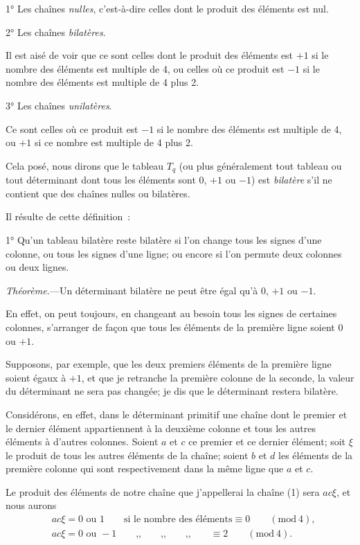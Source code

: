 \documentclass{article}
\begin{document}
1° Les chaînes \emph{nulles}, c'est-à-dire celles dont le produit des éléments est nul.

2° Les chaînes \emph{bilatères}.

Il est aisé de voir que ce sont celles dont le produit des éléments est $+1$ si le nombre des éléments est multiple de 4, ou celles où ce produit est $-1$ si le nombre des éléments est multiple de 4 plus 2.

3° Les chaînes \emph{unilatères}.

Ce sont celles où ce produit est $-1$ si le nombre des éléments est multiple de 4, ou $+1$ si ce nombre est multiple de 4 plus 2.

Cela posé, nous dirons que le tableau $T_{q}$ (ou plus généralement tout tableau ou tout déterminant dont tous les éléments sont 0, $+1$ ou $-1$) est \emph{bilatère} s'il ne contient que des chaînes nulles ou bilatères.

Il résulte de cette définition~:

1° Qu'un tableau bilatère reste bilatère si l'on change tous les signes d'une colonne, ou tous les signes d'une ligne; ou encore si l'on permute deux colonnes ou deux lignes.

\emph{Théorème.}---Un déterminant bilatère ne peut être égal qu'à 0, $+1$ ou $-1$.

En effet, on peut toujours, en changeant au besoin tous les signes de certaines colonnes, s'arranger de façon que tous les éléments de la première ligne soient 0 ou $+1$.

Supposons, par exemple, que les deux premiers éléments de la première ligne soient égaux à $+1$, et que je retranche la première colonne de la seconde, la valeur du déterminant ne sera pas changée; je dis que le déterminant restera bilatère.

Considérons, en effet, dans le déterminant primitif une chaîne dont le premier et le dernier élément appartiennent à la deuxième colonne
et tous les autres éléments à d'autres colonnes. Soient $a$ et $c$ ce premier et ce dernier élément; soit $\xi$ le produit de tous les autres éléments de la chaîne; soient $b$ et $d$ les éléments de la première colonne qui sont respectivement dans la même ligne que $a$ et $c$.

Le produit des éléments de notre chaîne que j'appellerai la chaîne (1) sera $ac\xi$, et nous aurons
\[ \begin{aligned} &ac\xi = 0 \text{ ou } 1 \qquad \text{si le nombre des éléments} \equiv 0 \qquad (\text{mod}\ 4),\\ &ac\xi = 0 \text{ ou } -1 \qquad \text{,,} \qquad \text{,,} \qquad \text{,,} \qquad \equiv 2 \qquad (\text{mod}\ 4). \end{aligned} \]
\end{document}
